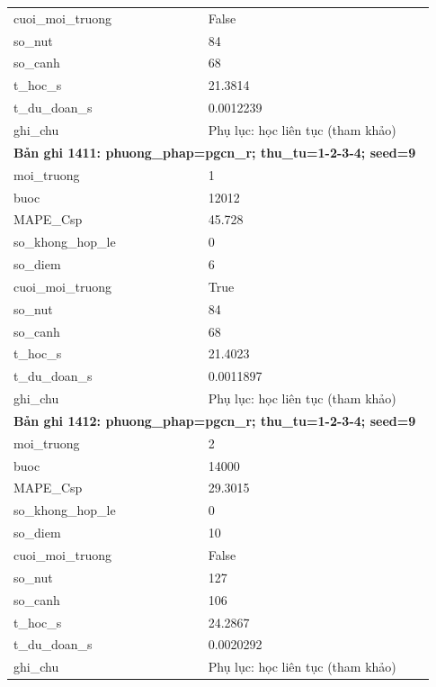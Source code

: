 \begin{longtable}{p{0.43\linewidth}p{0.50\linewidth}}
cuoi\_\allowbreak moi\_\allowbreak truong & False \\
so\_\allowbreak nut & 84 \\
so\_\allowbreak canh & 68 \\
t\_\allowbreak hoc\_\allowbreak s & 21.3814 \\
t\_\allowbreak du\_\allowbreak doan\_\allowbreak s & 0.0012239 \\
ghi\_\allowbreak chu & Phụ lục: học liên tục (tham khảo) \\
\midrule
\multicolumn{2}{p{0.95\linewidth}}{\textbf{Bản ghi 1411: phuong\_phap=pgcn\_r; thu\_tu=1-2-3-4; seed=9}} \\
moi\_\allowbreak truong & 1 \\
buoc & 12012 \\
MAPE\_\allowbreak Csp & 45.728 \\
so\_\allowbreak khong\_\allowbreak hop\_\allowbreak le & 0 \\
so\_\allowbreak diem & 6 \\
cuoi\_\allowbreak moi\_\allowbreak truong & True \\
so\_\allowbreak nut & 84 \\
so\_\allowbreak canh & 68 \\
t\_\allowbreak hoc\_\allowbreak s & 21.4023 \\
t\_\allowbreak du\_\allowbreak doan\_\allowbreak s & 0.0011897 \\
ghi\_\allowbreak chu & Phụ lục: học liên tục (tham khảo) \\
\midrule
\multicolumn{2}{p{0.95\linewidth}}{\textbf{Bản ghi 1412: phuong\_phap=pgcn\_r; thu\_tu=1-2-3-4; seed=9}} \\
moi\_\allowbreak truong & 2 \\
buoc & 14000 \\
MAPE\_\allowbreak Csp & 29.3015 \\
so\_\allowbreak khong\_\allowbreak hop\_\allowbreak le & 0 \\
so\_\allowbreak diem & 10 \\
cuoi\_\allowbreak moi\_\allowbreak truong & False \\
so\_\allowbreak nut & 127 \\
so\_\allowbreak canh & 106 \\
t\_\allowbreak hoc\_\allowbreak s & 24.2867 \\
t\_\allowbreak du\_\allowbreak doan\_\allowbreak s & 0.0020292 \\
ghi\_\allowbreak chu & Phụ lục: học liên tục (tham khảo) \\

\end{longtable}
